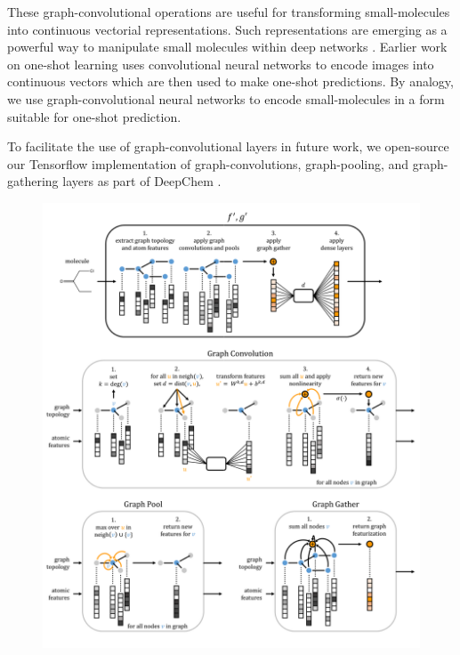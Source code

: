 \documentclass[journal=jacsat,manuscript=article]{achemso}
\providecommand{\DIFaddbegin}{} %
\providecommand{\DIFdelbegin}{} %
\providecommand{\DIFdelend}{} %
\providecommand{\DIFaddendFL}{} %
\begin{document}
These graph-convolutional operations are useful for transforming small-molecules into continuous vectorial representations. Such representations are emerging as a powerful way to manipulate small molecules within deep networks \cite{gomez2016automatic}. Earlier work on one-shot learning uses convolutional neural networks to encode images into continuous vectors which are then used to make one-shot predictions. By analogy, we use graph-convolutional neural networks to encode small-molecules in a form suitable for one-shot prediction.

To facilitate the use of graph-convolutional layers in future work, we open-source our Tensorflow\cite{abadi2016tensorflow} implementation of graph-convolutions, graph-pooling, and graph-gathering layers as part of DeepChem \cite{ram2016}.

\DIFdelbegin %
\DIFdelend \DIFaddbegin \begin{figure}[H]
\includegraphics[width=\textwidth]{graphconv_graphic_v2.png}
\DIFaddendFL {}
\label{conv}
\end{figure}
\end{document}
